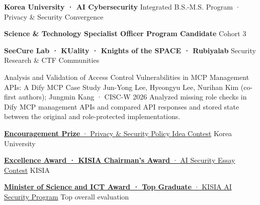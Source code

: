 \def\cvpdftitle{hy30nq | Security Research CV}
\def\cvfooterlabel{hy30nq · Security Research CV}
\def\cvupdated{Updated October 2026}



\sffamily



  {\textbf{Korea University · AI Cybersecurity}}
  {Integrated B.S.-M.S. Program · Privacy \& Security Convergence}

  {\textbf{Science \& Technology Specialist Officer Program Candidate}}
  {Cohort 3}

\compactentry{}
  {\textbf{SeeCure Lab · KUality · Knights of the SPACE · Rubiyalab}}
  {Security Research \& CTF Communities}


  {Analysis and Validation of Access Control Vulnerabilities in MCP Management APIs: A Dify MCP Case Study}
  {Jun-Yong Lee, Hyeongyu Lee, Nurihan Kim (co-first authors); Jungmin Kang · CISC-W 2026}
  {Analyzed missing role checks in Dify MCP management APIs and compared API responses and stored state between the original and role-protected implementations.}


  {\href{https://security.korea.ac.kr/m06_04/59}{\textbf{Encouragement Prize} · Privacy \& Security Policy Idea Contest}}
  {Korea University}

  {\href{https://blog.naver.com/kisiaedu/223785868393}{\textbf{Excellence Award · KISIA Chairman's Award} · AI Security Essay Contest}}
  {KISIA}

  {\href{https://www.kisia.or.kr/talent_support/education_business/ai_security_technology_development/}{\textbf{Minister of Science and ICT Award · Top Graduate} · KISIA AI Security Program}}
  {Top overall evaluation}

